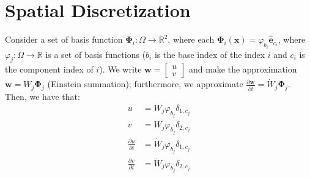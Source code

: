 \documentclass{article}
\newcommand{\bvec}[1]{\boldsymbol{#1}}
\newcommand{\brvec}[1]{\mathbf{#1}}
\begin{document}
\newpage

\section{Spatial Discretization}

Consider a set of basis function $\bvec{\Phi}_i : \Omega \rightarrow \mathbb{R}^2$,
where each $\bvec{\Phi}_i(\bvec{x}) = \varphi_{b_i} \hat{\brvec{e}}_{c_i}$,
where $\varphi_j : \Omega \rightarrow \mathbb{R}$ is a set of basis functions
($b_i$ is the base index of the index $i$ and $c_i$ is the component index of $i$).
We write $\bvec{w} = \begin{bmatrix}
    u \\
    v
\end{bmatrix}$ and make the approximation $\bvec{w} = W_j \bvec{\Phi}_j$ (Einstein summation);
furthermore, we approximate $\frac{\partial \bvec{w}}{\partial t} = \dot{W}_j \bvec{\Phi}_j$.
Then, we have that:
\begin{align*}
    u & = W_j \varphi_{b_j} \delta_{1, c_j} \\
    v & = W_j \varphi_{b_j} \delta_{2, c_j} \\
    \frac{\partial u}{\partial t} & = \dot{W}_j \varphi_{b_j} \delta_{1, c_j} \\
    \frac{\partial v}{\partial t} & = \dot{W}_j \varphi_{b_j} \delta_{2, c_j}
\end{align*}
\end{document}
